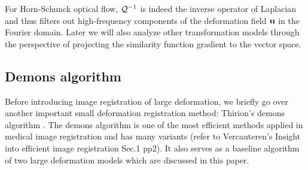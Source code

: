 \documentclass[letterpaper,12pt]{article}
\begin{document}
For Horn-Schunck optical flow, $\mathcal{Q}^{-1}$ is indeed the inverse
operator of Laplacian and thus filters out high-frequency components
of the deformation field $\mathbf{u}$ in the Fourier domain. Later we will
also analyze other transformation models through the perspective of
projecting the similarity function gradient to the vector space.	







\subsection{Demons algorithm}
\label{sec:demons}

Before introducing image registration of large deformation, we briefly
go over another important small deformation registration method:
Thirion's demons algorithm \cite{Thirion98}.  The demons algorithm is
one of the most efficient methods applied in medical image
registration and has many variants (refer to Vercauteren's Insight into efficient image registration Sec.1 pp2). It also serves as a baseline algorithm of two large deformation models which are discussed in this paper. 
\end{document}

